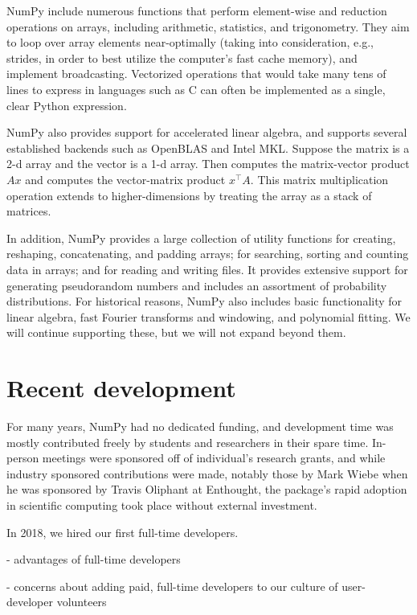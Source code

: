NumPy include numerous functions that perform element-wise and reduction operations on arrays, including arithmetic, statistics, and trigonometry.  They aim to loop over array elements near-optimally (taking into consideration, e.g., strides, in order to best utilize the computer's fast cache memory), and implement broadcasting.  Vectorized operations that would take many tens of lines to express in languages such as C can often be implemented as a single, clear Python expression.

NumPy also provides support for accelerated linear algebra, and supports several established backends such as OpenBLAS and Intel MKL.  Suppose the matrix  is a 2-d array and the vector  is a 1-d array.  Then  computes the matrix-vector product $Ax$ and
 computes the vector-matrix product $x^\top A$.
This matrix multiplication operation extends to higher-dimensions by
treating the array as a stack of matrices.

In addition, NumPy provides a large collection of utility functions for creating, reshaping, concatenating, and padding arrays; for searching, sorting and counting data in arrays; and for reading and writing files.  It provides extensive support for generating pseudorandom numbers and includes an assortment of probability distributions.  For historical reasons, NumPy also includes basic functionality for linear algebra, fast Fourier transforms and windowing, and polynomial fitting.  We will continue supporting these, but we will not expand beyond them.

\section*{Recent development}

For many years, NumPy had no dedicated funding, and development time
was mostly contributed freely by students and researchers in their
spare time.  In-person meetings were sponsored off of individual's
research grants, and while industry sponsored contributions were made,
notably those by Mark Wiebe when he was sponsored by Travis Oliphant
at Enthought, the package's rapid adoption in scientific
computing took place without external investment.

In 2018, we hired our first full-time developers.

- advantages of full-time developers

- concerns about adding paid, full-time developers to our culture of user-developer volunteers

